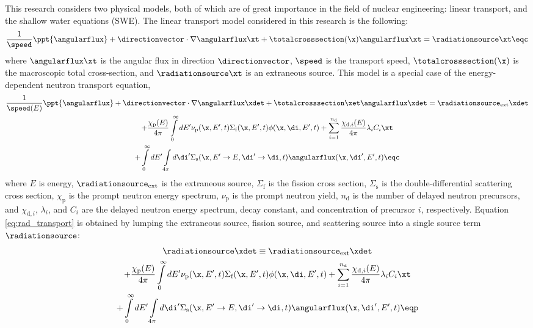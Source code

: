 This research considers two physical models, both of which are of
great importance in the field of nuclear engineering:
linear transport, and the shallow water equations (SWE).
The linear transport model considered in this research is the following:
\begin{equation}\label{eq:rad_transport}
  \frac{1}{\speed}\ppt{\angularflux} + \directionvector\cdot\nabla\angularflux\xt
  + \totalcrosssection(\x)\angularflux\xt = \radiationsource\xt \eqc
\end{equation}
where $\angularflux\xt$ is the angular flux in direction $\directionvector$,
$\speed$ is the transport speed, $\totalcrosssection(\x)$
is the macroscopic total cross-section, and $\radiationsource\xt$ is an
extraneous source.
This model is a special case of the energy-dependent neutron transport equation,
\begin{multline}
  \frac{1}{\speed(E)}\ppt{\angularflux} + \directionvector\cdot\nabla\angularflux\xdet
    + \totalcrosssection\xet\angularflux\xdet = \radiationsource_{\text{ext}}\xdet\\
    + \frac{\chi_\text{p}(E)}{4\pi}\int\limits_0^\infty
      dE'\nu_\text{p}(\x,E',t)\Sigma_\text{f}(\x,E',t)\phi(\x,\di,E',t)
    + \sum\limits_{i=1}^{n_\text{d}}\frac{\chi_{\text{d},i}(E)}{4\pi}\lambda_i C_i\xt\\
    + \int\limits_0^\infty dE'\int\limits_{4\pi}d\di'
      \Sigma_\text{s}(\x,E'\rightarrow E,\di'\rightarrow\di,t)\angularflux(\x,\di',E',t)
  \eqc
\end{multline}
where $E$ is energy,
$\radiationsource_{\text{ext}}$ is the extraneous source,
$\Sigma_\text{f}$ is the fission cross section,
$\Sigma_\text{s}$ is the double-differential scattering cross section,
$\chi_\text{p}$ is the prompt
neutron energy spectrum, $\nu_\text{p}$ is the prompt
neutron yield, $n_\text{d}$ is the number of delayed neutron precursors,
and $\chi_{\text{d},i}$, $\lambda_i$, and $C_i$ are the delayed neutron
energy spectrum, decay constant, and concentration of precursor $i$, respectively.
Equation \eqref{eq:rad_transport} is obtained by lumping the extraneous source,
fission source, and scattering source into a single source term
$\radiationsource$:
\begin{multline}
  \radiationsource\xdet \equiv \radiationsource_{\text{ext}}\xdet\\
    + \frac{\chi_\text{p}(E)}{4\pi}\int\limits_0^\infty
      dE'\nu_\text{p}(\x,E',t)\Sigma_\text{f}(\x,E',t)\phi(\x,\di,E',t)
    + \sum\limits_{i=1}^{n_\text{d}}\frac{\chi_{\text{d},i}(E)}{4\pi}\lambda_i C_i\xt\\
    + \int\limits_0^\infty dE'\int\limits_{4\pi}d\di'
      \Sigma_\text{s}(\x,E'\rightarrow E,\di'\rightarrow\di,t)\angularflux(\x,\di',E',t)
  \eqp
\end{multline}
